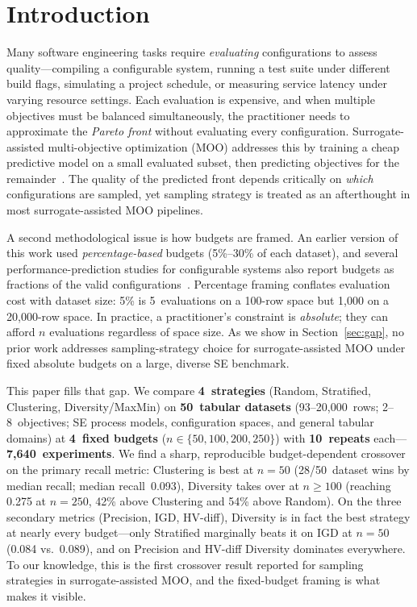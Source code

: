 \documentclass[sigconf,nonacm]{acmart}
\begin{document}
\maketitle

\section{Introduction}
\label{sec:intro}

Many software engineering tasks require \emph{evaluating} configurations to
assess quality---compiling a configurable system, running a test suite under
different build flags, simulating a project schedule, or measuring service
latency under varying resource settings.
Each evaluation is expensive, and when multiple objectives must be balanced
simultaneously, the practitioner needs to approximate the \emph{Pareto front}
without evaluating every configuration.
Surrogate-assisted multi-objective optimization (MOO) addresses this by
training a cheap predictive model on a small evaluated subset, then predicting
objectives for the remainder~\cite{wang2020adaptive,nair2018finding}.
The quality of the predicted front depends critically on \emph{which}
configurations are sampled, yet sampling strategy is treated as an afterthought
in most surrogate-assisted MOO pipelines.

A second methodological issue is how budgets are framed.
An earlier version of this work used \emph{percentage-based} budgets
(5\%--30\% of each dataset), and several performance-prediction studies for
configurable systems also report budgets as fractions of the valid
configurations~\cite{siegmund2012predicting,guo2018data}.
Percentage framing conflates evaluation cost with dataset size: 5\% is
5~evaluations on a 100-row space but 1{,}000 on a 20{,}000-row space.
In practice, a practitioner's constraint is \emph{absolute}; they can afford
$n$ evaluations regardless of space size.
As we show in Section~\ref{sec:gap}, no prior work addresses sampling-strategy
choice for surrogate-assisted MOO under fixed absolute budgets on a large,
diverse SE benchmark.

This paper fills that gap.
We compare \textbf{4~strategies} (Random, Stratified, Clustering,
Diversity/MaxMin) on \textbf{50~tabular datasets} (93--20{,}000~rows;
2--8~objectives; SE process models, configuration spaces, and general tabular
domains) at \textbf{4~fixed budgets} ($n\in\{50,100,200,250\}$) with
\textbf{10~repeats} each---\textbf{7{,}640~experiments}.
We find a sharp, reproducible budget-dependent crossover on the primary
recall metric: Clustering is best at $n=50$ (28/50~dataset wins by median
recall; median recall~0.093), Diversity takes over at $n\geq 100$ (reaching
0.275 at $n=250$, 42\% above Clustering and 54\% above Random).
On the three secondary metrics (Precision, IGD, HV-diff), Diversity is in
fact the best strategy at nearly every budget---only Stratified marginally
beats it on IGD at $n=50$ (0.084 vs.\ 0.089), and on Precision and HV-diff
Diversity dominates everywhere.
To our knowledge, this is the first crossover result reported for sampling
strategies in surrogate-assisted MOO, and the fixed-budget framing is what
makes it visible.
\end{document}
